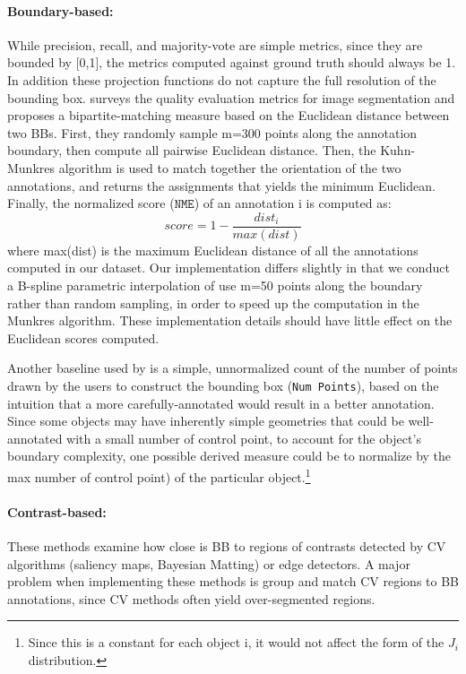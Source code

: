 \documentclass[12pt]{article}
\begin{document}
\paragraph{Boundary-based:} \par While precision, recall, and majority-vote are simple metrics, since they are bounded by [0,1], the metrics computed against ground truth should always be 1. In addition these projection functions do not capture the full resolution of the bounding box.  \cite{Vittayakorn2011} surveys the quality evaluation metrics for image segmentation  and proposes a bipartite-matching measure based on the Euclidean distance between two BBs. First, they randomly sample m=300 points along the annotation boundary, then compute all pairwise Euclidean distance. Then, the Kuhn-Munkres algorithm is used to match together the orientation of the two annotations, and returns the assignments that yields the minimum Euclidean. Finally, the normalized score ($\texttt{NME}$) of an annotation i is computed as:
\begin{equation}
score = 1-\frac{dist_i}{max(dist)}
\end{equation} where max(dist) is the maximum Euclidean distance of all the annotations computed in our dataset. Our implementation differs slightly in that we conduct a B-spline parametric interpolation of use m=50 points along the boundary rather than random sampling, in order to speed up the computation in the Munkres algorithm. These implementation details should have little effect on the Euclidean scores computed.
\par  Another baseline used by \cite{Vittayakorn2011} is a simple, unnormalized count of the number of points drawn by the users to construct the bounding box (\texttt{Num Points}), based on the intuition that a more carefully-annotated would result in a better annotation. Since some objects may have inherently simple geometries that could be well-annotated with a small number of control point, to account for the object's boundary complexity, one possible derived measure could be to normalize by the max number of control point) of the particular object.\footnote{Since this is a constant for each object i, it would not affect the form of the $J_i$ distribution.} 
\paragraph{Contrast-based: } These methods examine how close is BB to regions of contrasts detected by CV algorithms (saliency maps, Bayesian Matting) or edge detectors. A major problem when implementing these methods is group and match CV regions to BB annotations, since CV methods often yield over-segmented regions.
\end{document}
